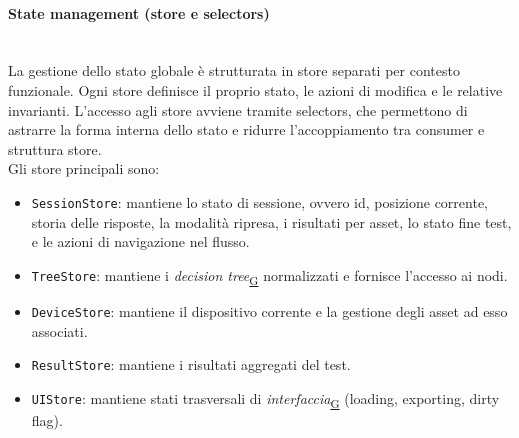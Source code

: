 \documentclass[a4paper,12pt]{article}
\begin{document}
            \paragraph{State management (store e selectors)}\mbox{}\\
                La gestione dello stato globale è strutturata in store separati per contesto funzionale. Ogni store definisce il proprio stato, le azioni di modifica e le relative invarianti. L'accesso agli store avviene tramite selectors, che permettono di astrarre la forma interna dello stato e ridurre l'accoppiamento tra consumer e struttura store. \\
                Gli store principali sono:
                \begin{itemize}
                    \item \texttt{SessionStore}: mantiene lo stato di sessione, ovvero id, posizione corrente, storia delle risposte, la modalità ripresa, i risultati per asset, lo stato fine test, e le azioni di navigazione nel flusso.
                    \item \texttt{TreeStore}: mantiene i \textit{decision tree}\textsubscript{\href{https://atlasteam9.github.io/Atlas/glossario.html\#DecisionTree}{G}} normalizzati e fornisce l'accesso ai nodi.
                    \item \texttt{DeviceStore}: mantiene il dispositivo corrente e la gestione degli asset ad esso associati.
                    \item \texttt{ResultStore}: mantiene i risultati aggregati del test.
                    \item \texttt{UIStore}: mantiene stati trasversali di \textit{interfaccia}\textsubscript{\href{https://atlasteam9.github.io/Atlas/glossario.html\#Interfaccia}{G}} (loading, exporting, dirty flag).
                \end{itemize}
        
\end{document}
